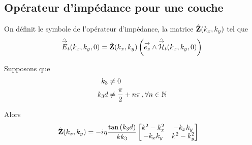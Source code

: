     \subsection{Opérateur d'impédance pour une couche}

        \begin{defn}
            On définit le symbole de l'opérateur d'impédance, la matrice \(\hat {\mathbf{Z}}(k_x,k_y)\) tel que
            \begin{equation}
                \hat {{\overset{\rightarrow}{E}}}_t(k_x,k_y,0) = \hat {\mathbf{Z}}(k_x,k_y) \left({\overset{\rightarrow}{e_z}} \wedge \hat {{\overset{\rightarrow}{\mathcal{H}}}}_t(k_x,k_y,0)\right)
            \end{equation}
        \end{defn}

        \begin{thm}
            Supposons que
            \begin{subequations}
                \label{eq:imp_fourier:plan:hyp_1_c}
                \begin{align}
                    k_3     & \not =0 \\
                    k_3d    & \not = \dfrac{\pi}{2}+n\pi\,, \forall n \in \mathbb N
                \end{align}
            \end{subequations}

            Alors
            \begin{align}
            \label{eq:imp_plan:symb_z:1c}
            \hat {\mathbf{Z}}(k_x,k_y) &= -i\eta\dfrac{\tan\left(k_3d\right)}{kk_3}
                \begin{bmatrix}
                   k^2-k_x^2  & -k_xk_y\\
                    -k_xk_y & k^2-k_y^2\\
                \end{bmatrix}
            \end{align}
        \end{thm}

